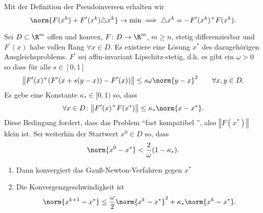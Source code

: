 Mit der Definition der Pseudoinversen erhalten wir
\begin{equation*}
 \norm{F (x^k)+F' (x^k) \triangle x^k} \to \min \implies \triangle x^k=-F^{\prime} (x^k )^+F (x^k).
\end{equation*}

\begin{satz}
Sei $D \subset \R^m$ offen und konvex, $F \colon D \to \R^m$, $m\geq n$, stetig differenzierbar und $F^{\prime}(x)$ habe vollen Rang $\forall x \in D$. Es existiere eine Lösung $x^*$ des dazugehörigen Ausgleichsproblems. $F^{\prime}$ sei
affin-invariant Lipschitz-stetig, d.h. es gibt ein $\omega>0$ so dass für alle $s \in [0,1]$
\begin{equation*}
 \big\Vert F'(x)^+(F'(x+s(y-x))-F'(x)) \big\Vert \leq s \omega \norm{y-x}^2
 \qquad \forall x,y \in D.
\end{equation*}
Es gebe eine Konstante $\kappa_* \in [0,1)$ so, dass
\begin{equation*}
    \forall x \in D \colon \big\Vert F'(x)^+F(x^*) \big\Vert \leq \kappa_* \norm{x-x^*}.
\end{equation*}
Diese Bedingung fordert, dass das Problem "`fast kompatibel "', also $\left\Vert F (x^* ) \right\Vert$ klein ist. Sei weiterhin der Startwert $x^0 \in D$ so, dass
\begin{equation*}
 \norm{x^0-x^*} < \frac{2}{\omega}(1-\kappa_*).
\end{equation*}
\begin{enumerate}
  \item Dann konvergiert das Gauß-Newton-Verfahren gegen $x^*$
  \item Die Konvergenzgeschwindigkeit ist
    \begin{equation}
      \norm{x^{k+1}-x^*} \le \frac{\omega}{2} \norm{x^k-x^*}^2+\kappa_* \norm{x^k-x^*}.
    \end{equation}
\end{enumerate}
\end{satz}

